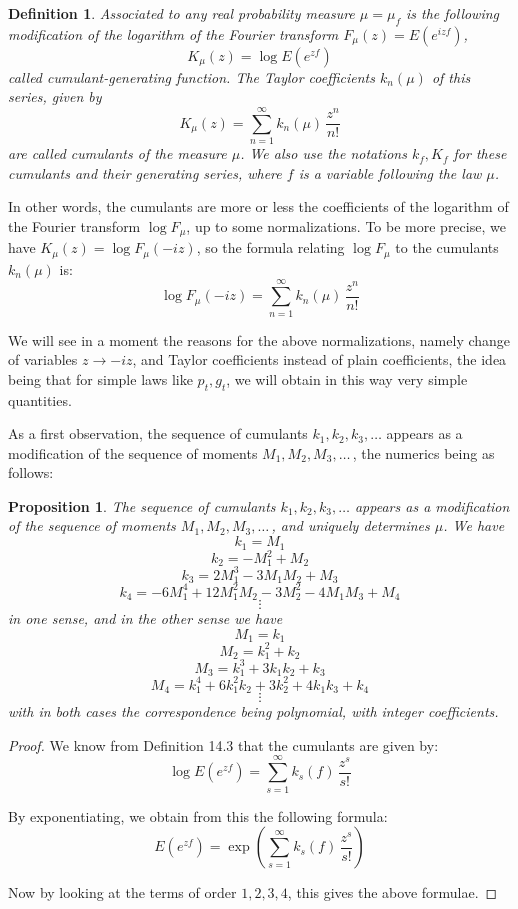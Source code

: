 \documentclass[12pt]{amsbook}
\newtheorem{definition}[theorem]{Definition}
\newtheorem{proposition}[theorem]{Proposition}
\begin{document}

\begin{definition}
Associated to any real probability measure $\mu=\mu_f$ is the following modification of the logarithm of the Fourier transform $F_\mu(z)=E(e^{izf})$,
$$K_\mu(z)=\log E(e^{zf})$$
called cumulant-generating function. The Taylor coefficients $k_n(\mu)$ of this series, given by
$$K_\mu(z)=\sum_{n=1}^\infty k_n(\mu)\,\frac{z^n}{n!}$$
are called cumulants of the measure $\mu$. We also use the notations $k_f,K_f$ for these cumulants and their generating series, where $f$ is a variable following the law $\mu$.
\end{definition}

In other words, the cumulants are more or less the coefficients of the logarithm of the Fourier transform $\log F_\mu$, up to some normalizations. To be more precise, we have $K_\mu(z)=\log F_\mu(-iz)$, so the formula relating $\log F_\mu$ to the cumulants $k_n(\mu)$ is:
$$\log F_\mu(-iz)=\sum_{n=1}^\infty k_n(\mu)\,\frac{z^n}{n!}$$

We will see in a moment the reasons for the above normalizations, namely change of variables $z\to -iz$, and Taylor coefficients instead of plain coefficients, the idea being that for simple laws like $p_t,g_t$, we will obtain in this way very simple quantities.

\bigskip

As a first observation, the sequence of cumulants $k_1,k_2,k_3,\ldots$ appears as a modification of the sequence of moments $M_1,M_2,M_3,\ldots\,$, the numerics being as follows:


\begin{proposition}
The sequence of cumulants $k_1,k_2,k_3,\ldots$ appears as a modification of the sequence of moments $M_1,M_2,M_3,\ldots\,$, and uniquely determines $\mu$. We have
$$k_1=M_1$$
$$k_2=-M_1^2+M_2$$
$$k_3=2M_1^3-3M_1M_2+M_3$$
$$k_4=-6M_1^4+12M_1^2M_2-3M_2^2-4M_1M_3+M_4$$
$$\vdots$$
in one sense, and in the other sense we have
$$M_1=k_1$$
$$M_2=k_1^2+k_2$$
$$M_3=k_1^3+3k_1k_2+k_3$$
$$M_4=k_1^4+6k_1^2k_2+3k_2^2+4k_1k_3+k_4$$
$$\vdots$$
with in both cases the correspondence being polynomial, with integer coefficients.
\end{proposition}

\begin{proof}
We know from Definition 14.3 that the cumulants are given by:
$$\log E(e^{zf})=\sum_{s=1}^\infty k_s(f)\,\frac{z^s}{s!}$$

By exponentiating, we obtain from this the following formula:
$$E(e^{zf})=\exp\left(\sum_{s=1}^\infty k_s(f)\,\frac{z^s}{s!}\right)$$

Now by looking at the terms of order $1,2,3,4$, this gives the above formulae.
\end{proof}
\end{document}

